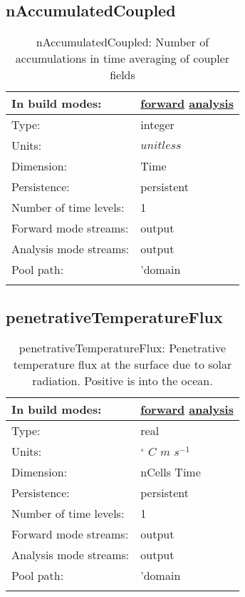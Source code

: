 \subsection[nAccumulatedCoupled]{nAccumulatedCoupled}
\label{subsec:var_sec_forcing_nAccumulatedCoupled}
\begin{center}
\begin{longtable}{| p{2.0in} | p{4.0in} |}
        \hline 
        In build modes: & \hyperref[subsec:forward_var_tab_forcing]{forward} \hyperref[subsec:analysis_var_tab_forcing]{analysis} \\
        \hline 
        Type: & integer \\
        \hline 
        Units: & $unitless$ \\
        \hline 
        Dimension: & Time \\
        \hline 
        Persistence: & persistent \\
        \hline 
        Number of time levels: & 1 \\
        \hline 
		 Forward mode streams: &  output \\
        \hline 
		 Analysis mode streams: &  output \\
        \hline 
            Pool path: & 'domain %
 \\
		 \hline 
    \caption{nAccumulatedCoupled: Number of accumulations in time averaging of coupler fields}
\end{longtable}
\end{center}
\subsection[penetrativeTemperatureFlux]{penetrativeTemperatureFlux}
\label{subsec:var_sec_forcing_penetrativeTemperatureFlux}
\begin{center}
\begin{longtable}{| p{2.0in} | p{4.0in} |}
        \hline 
        In build modes: & \hyperref[subsec:forward_var_tab_forcing]{forward} \hyperref[subsec:analysis_var_tab_forcing]{analysis} \\
        \hline 
        Type: & real \\
        \hline 
        Units: & $^\circ$ $C$ $m$ $s^{-1}$ \\
        \hline 
        Dimension: & nCells Time \\
        \hline 
        Persistence: & persistent \\
        \hline 
        Number of time levels: & 1 \\
        \hline 
		 Forward mode streams: &  output \\
        \hline 
		 Analysis mode streams: &  output \\
        \hline 
            Pool path: & 'domain %
 \\
		 \hline 
    \caption{penetrativeTemperatureFlux: Penetrative temperature flux at the surface due to solar radiation. Positive is into the ocean.}
\end{longtable}
\end{center}
